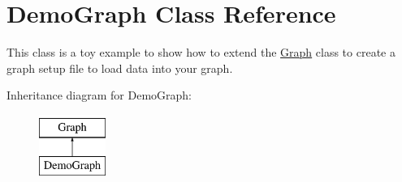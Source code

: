 \hypertarget{classDemoGraph}{
\section{DemoGraph Class Reference}
\label{classDemoGraph}
}


This class is a toy example to show how to extend the \hyperlink{classGraph}{Graph} class to create a graph setup file to load data into your graph.  


Inheritance diagram for DemoGraph:\begin{figure}[H]
\begin{center}
\leavevmode
\includegraphics[height=2.000000cm]{classDemoGraph}
\end{center}
\end{figure}
